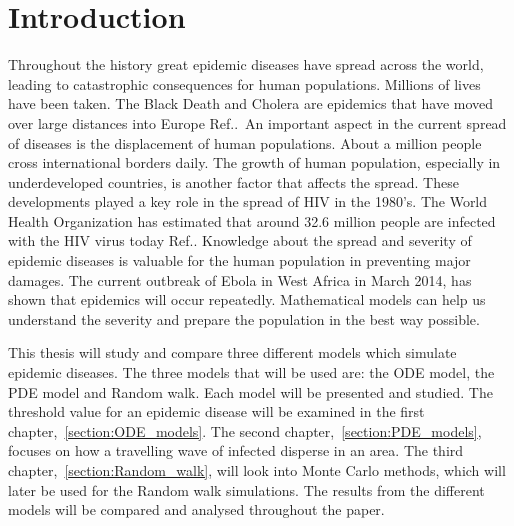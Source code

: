 \documentclass[%
twoside,                 %
final,                   %
chapterprefix=true,      %
open=right               %
10pt]{book}
\begin{document}

% 
% 

\chapter{Introduction}
Throughout the history great epidemic diseases have spread across the world, leading to catastrophic consequences for human populations. Millions of lives have been taken. The Black Death and Cholera are epidemics that have moved over large distances into Europe Ref.\cite[p.~315]{murray2002mathematical}.~An important aspect in the current spread of diseases is the displacement of human populations. About a million people cross international borders daily. The growth of human population, especially in underdeveloped countries, is another factor that affects the spread. These developments played a key role in the spread of HIV in the 1980's. The World Health Organization has estimated that around 32.6 million people are infected with the HIV virus today Ref.\cite{who_hiv}. Knowledge about the spread and severity of epidemic diseases is valuable for the human population in preventing major damages. The current outbreak of Ebola in West Africa in March 2014, has shown that epidemics will occur repeatedly. Mathematical models can help us understand the severity and prepare the population in the best way possible.


\vspace{3mm}




\vspace{3mm}


This thesis will study and compare three different models which simulate epidemic diseases. The three models that will be used are: the ODE model, the PDE model and Random walk. Each model will be presented and studied. The threshold value for an epidemic disease will be examined in the first chapter,~\ref{section:ODE_models}. The second chapter,~\ref{section:PDE_models}, focuses on how a travelling wave of infected disperse in an area. The third chapter,~\ref{section:Random_walk}, will look into Monte Carlo methods, which will later be used for the Random walk simulations. The results from the different models will be compared and analysed throughout the paper.


\vspace{3mm}
\end{document}
